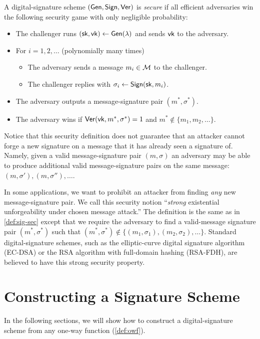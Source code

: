 \begin{definition}\label{def:sig-sec}
  A digital-signature scheme $(\mathsf{Gen}, \mathsf{Sign}, \mathsf{Ver})$ is \emph{secure} if
  all efficient adversaries win the following security 
  game with only negligible probability:
  \begin{itemize}[noitemsep]
    \item The challenger runs $({\mathsf{sk}}, \mathsf{vk}) \gets \mathsf{Gen}(\lambda)$ and sends $\mathsf{vk}$ to the adversary.
    \item For $i = 1, 2, \dots$  (polynomially many times)
      \begin{itemize}
        \item The adversary sends a message $m_i \in \mathcal{M}$ to the challenger.
        \item The challenger replies with $\sigma_i \gets \mathsf{Sign}({\mathsf{sk}}, m_i)$.
      \end{itemize}
    \item The adversary outputs a message-signature pair $(m^*, \sigma^*)$.
    \item The adversary wins if $\mathsf{Ver}(\mathsf{vk}, m^*, \sigma^*) = 1$ and $m^* \not \in \{m_1, m_2, \dots\}$.
  \end{itemize}
\end{definition}

Notice that this   security definition does not guarantee that an attacker cannot forge a new signature on a message that it has already seen a signature of. 
Namely, given a valid
message-signature pair $(m, \sigma)$ an adversary may be able to produce additional valid message-signature
pairs on the same message: $(m, \sigma'), (m, \sigma''), \dots$.

In some applications, we want to prohibit an attacker from finding \emph{any}
new message-signature pair. We call this security notion ``\emph{strong} existential unforgeability under chosen message attack.''  
The definition is the same as in \cref{def:sig-sec} except that we require
the adversary to find a valid-message signature pair $(m^*, \sigma^*)$
such that $(m^*, \sigma^*) \not \in \{ (m_1, \sigma_1), (m_2, \sigma_2), \dots \}$.
Standard digital-signature schemes, such as the elliptic-curve digital signature
algorithm (EC-DSA) or the RSA algorithm with full-domain hashing (RSA-FDH),
are believed to have this strong security property.

\section{Constructing a Signature Scheme}
In the following sections, we will show how to construct a digital-signature
scheme from any one-way function (\cref{def:owf}).

